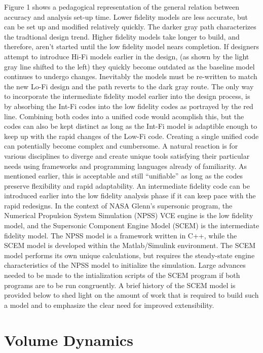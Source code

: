\documentclass[heading.tex]{subfiles}
\begin{document}
Figure 1 shows a pedagogical representation of the general relation between accuracy and analysis set-up time. Lower fidelity  models are less accurate, but can be set up and modified relatively quickly. The darker gray path characterizes the tradtional design trend. Higher fidelity models take longer to build, and therefore, aren’t started until the low fidelity model nears completion. If designers attempt to introduce Hi-Fi models earlier in the design, (as shown by the light gray line shifted to the left) they quickly become outdated as the baseline model continues to undergo changes. Inevitably the models must be re-written to match the new Lo-Fi design and the path reverts to the dark gray route. The only way to incorporate the intermediate fidelity model earlier into the design process, is by absorbing the Int-Fi codes into the low fidelity codes as portrayed by the red line. Combining both codes into a unified code would acomplish this, but the codes can also be kept distinct as long as the Int-Fi model is adaptible enough to keep up with the rapid changes of the Low-Fi code. Creating a single unified code can potentially become complex and cumbersome. A natural reaction is for various disciplines to diverge and create unique tools satisfying their particular needs using frameworks and programming languages already of familiarity. As mentioned earlier, this is acceptable and still “unifiable” as long as the codes preserve flexibility and rapid adaptability. An intermediate fidelity code can be introduced earlier into the low fidelity analysis phase if it can keep pace with the rapid redesigns.
	In the context of NASA Glenn’s supersonic program, the Numerical Propulsion System Simulation (NPSS) VCE engine is the low fidelity model, and the Supersonic Component Engine Model (SCEM) is the intermediate fidelity model. The NPSS model is a framework written in C++, while the SCEM model is developed within the Matlab/Simulink environment. The SCEM model performs its own unique calculations, but requires the steady-state engine characteristics of the NPSS model to initialize the simulation. Large advances needed to be made to the intialization scripts of the SCEM program if both programs are to be run congruently. A brief history of the SCEM model is provided below to shed light on the amount of work that is required to build such a model and to emphasize the clear need for improved extensibility.  

\section{Volume Dynamics}
\end{document}

